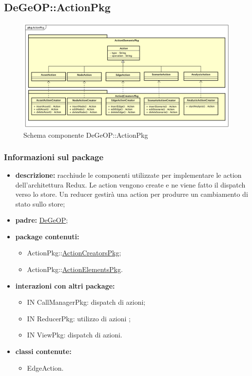 \subsection{DeGeOP::ActionPkg}
\label{pkg::ActionPkg}
\begin{figure}[H]
	\centering
	\includegraphics[width=\textwidth]{img/PkgDiagram/STActionPkg.png}
	\caption{Schema componente DeGeOP::ActionPkg}
\end{figure}
\subsubsection{Informazioni sul package}
\begin{itemize}
	\item \textbf{descrizione:} racchiude le componenti utilizzate per implementare le action dell'architettura Redux. Le action vengono create e ne viene fatto il dispatch verso lo store. Un reducer gestirà una action per produrre un cambiamento di stato sullo store;
	\item \textbf{padre:} \hyperref[pkg::DeGeOP]{DeGeOP};
	\item \textbf{package contenuti:}
	\begin{itemize}
		\item ActionPkg::\hyperref[pkg::ActionCreatorsPkg]{ActionCreatorsPkg};
		\item ActionPkg::\hyperref[pkg::ActionElementsPkg]{ActionElementsPkg}.
	\end{itemize}
	\item \textbf{interazioni con altri package:} 
	\begin{itemize}
		\item IN CallManagerPkg: dispatch di azioni;
		\item IN ReducerPkg: utilizzo di azioni ;
		\item IN ViewPkg: dispatch di azioni.
	\end{itemize}
	\item \textbf{classi contenute:}
	\begin{itemize}
		\item EdgeAction.
	\end{itemize}
\end{itemize}
